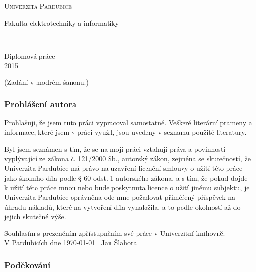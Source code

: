 \documentclass[11pt,a4paper,fleqn,titlepage,twoside,openany,export]{book}
\begin{document}
\makeatletter
\begin{titlepage}
	\begin{center}
	
	\textsc{\Huge{Univerzita Pardubice}}

	\LARGE{Fakulta elektrotechniky a informatiky}
	
	\vfill
	
	\huge{\@title}\\[2mm]
	\LARGE{\@author}
	
	\vfill

	\begin{normalsize}
	Diplomová práce\\
	2015
	\end{normalsize}
	\end{center}
\end{titlepage}


\newpage  
(Zadání v modrém šanonu.)
\thispagestyle{empty}
\hspace{0pt}

\newpage 
\thispagestyle{empty}
\hspace{0pt}

\onehalfspacing

\newpage 
\thispagestyle{empty}
\subsubsection*{Prohlášení autora}

Prohlašuji, že jsem tuto práci vypracoval samostatně. Veškeré literární prameny a informace, které jsem v práci využil, jsou uvedeny v seznamu použité literatury.

Byl jsem seznámen s tím, že se na moji práci vztahují práva a povinnosti vyplývající ze zákona č. 121/2000 Sb., autorský zákon, zejména se skutečností, že Univerzita Pardubice má právo na uzavření licenční smlouvy o užití této práce jako školního díla podle § 60 odst. 1 autorského zákona, a s tím, že pokud dojde k užití této práce mnou nebo bude poskytnuta licence o užití jinému subjektu, je Univerzita Pardubice oprávněna ode mne požadovat přiměřený příspěvek na úhradu nákladů, které na vytvoření díla vynaložila, a to podle okolností až do jejich skutečné výše.

Souhlasím s prezenčním zpřístupněním své práce v Univerzitní knihovně.\\[4cm]
V Pardubicích dne \today\ \hfill{} Jan Šlahora

\newpage 
\thispagestyle{empty}
\subsubsection*{Poděkování}
\end{document}
